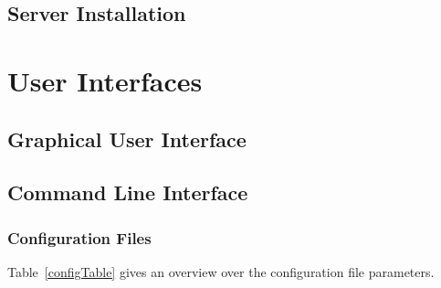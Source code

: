 \subsection{Server Installation}

\section{User Interfaces}

\subsection{Graphical User Interface}

\subsection{Command Line Interface}

\subsubsection{Configuration Files}

Table~\ref{configTable} gives an overview over the configuration file parameters.

